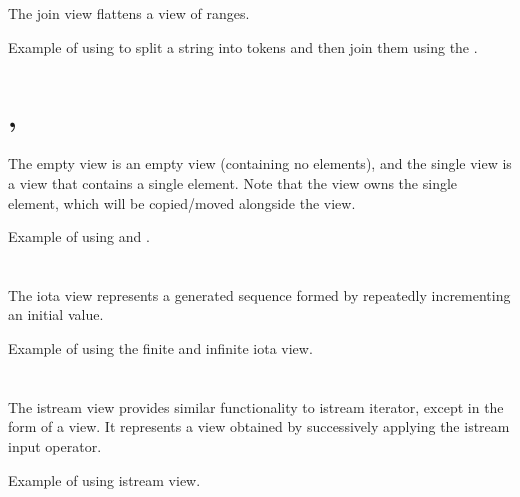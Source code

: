 The join view flattens a view of ranges.

\begin{codebox}[]{\href{https://compiler-explorer.com/z/MT7qbqjT6}{\ExternalLink}}
\footnotesize Example of using  to split a string into tokens and then join them using the .
\tcblower
{}
\end{codebox}

\section{\texorpdfstring{, }{\texttt{std::views::empty}, \texttt{std::views::single}}}

The empty view is an empty view (containing no elements), and the single view is a view that contains a single element.
Note that the view owns the single element, which will be copied/moved alongside the view.

\begin{codebox}[]{\href{https://compiler-explorer.com/z/d91M3o36e}{\ExternalLink}}
\footnotesize Example of using  and .
\tcblower
{}
\end{codebox}

\section{\texorpdfstring{}{\texttt{std::views::iota}}}

The iota view represents a generated sequence formed by repeatedly incrementing an initial value.

\begin{codebox}[]{\href{https://compiler-explorer.com/z/cEMdszTjE}{\ExternalLink}}
\footnotesize Example of using the finite and infinite iota view.
\tcblower
{}
\end{codebox}

\section{\texorpdfstring{}{\texttt{std::views::istream}}}

The istream view provides similar functionality to istream iterator, except in the form of a view.
It represents a view obtained by successively applying the istream input operator.

\begin{codebox}[]{\href{https://compiler-explorer.com/z/7r6x74PsY}{\ExternalLink}}
\footnotesize Example of using istream view.
\tcblower
{}
\end{codebox}